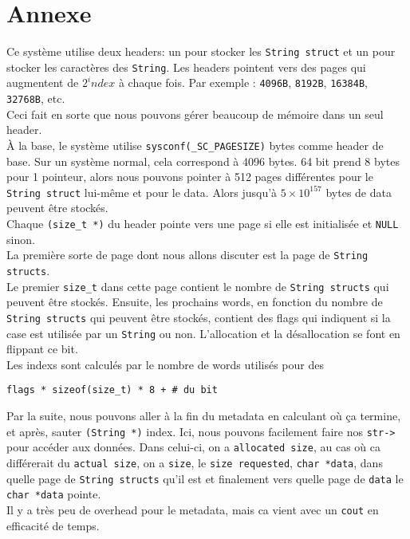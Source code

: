 \documentclass[10pt,a4paper]{article}
\begin{document}
\pagebreak

\section*{Annexe}
Ce système utilise deux headers: un pour stocker les \texttt{String struct} et un pour
stocker les caractères des \texttt{String}. Les headers pointent vers des pages qui
augmentent de $2^index$ à chaque fois. Par exemple : \texttt{4096B}, \texttt{8192B}, \texttt{16384B}, \texttt{32768B}, etc.\\
Ceci fait en sorte que nous pouvons gérer beaucoup de mémoire dans un seul header.\\

À la base, le système utilise \texttt{sysconf(\_SC\_PAGESIZE)} bytes comme header de base.
Sur un système normal, cela correspond à 4096 bytes. 64 bit prend 8 bytes 
pour 1 pointeur, alors nous pouvons pointer à 512 pages différentes pour le 
\texttt{String struct} lui-même et pour le data. Alors jusqu'à $5 \times 10^157$ bytes de data
peuvent être stockés.\\

Chaque \texttt{(size\_t *)} du header pointe vers une page si elle est initialisée et \texttt{NULL}
sinon.\\

La première sorte de page dont nous allons discuter est la page de \texttt{String structs}.\\
Le premier \texttt{size\_t} dans cette page contient le nombre de \texttt{String structs} qui peuvent être
stockés. Ensuite, les prochains words, en fonction du nombre de \texttt{String structs} qui 
peuvent être stockés, contient des flags qui indiquent si la case est utilisée par un 
\texttt{String} ou non. L'allocation et la désallocation se font en flippant ce bit.\\
Les indexs sont calculés par le nombre de words utilisés pour des 

\begin{lstlisting}
flags * sizeof(size_t) * 8 + # du bit
\end{lstlisting}
Par la suite, nous pouvons aller à la fin du metadata 
en calculant où ça termine, et après, sauter \texttt{(String *)} index. Ici, nous pouvons facilement
faire nos \texttt{str->} pour accéder aux données. Dans celui-ci, on a \texttt{allocated size}, au cas où
ca différerait du \texttt{actual size}, on a \texttt{size}, le \texttt{size requested}, \texttt{char *data}, dans quelle page
de \texttt{String structs} qu'il est et finalement vers quelle page de \texttt{data} le \texttt{char *data} pointe.\\
Il y a très peu de overhead pour le metadata, mais ca vient avec un \texttt{cout} en 
efficacité de temps.\\
\end{document}

